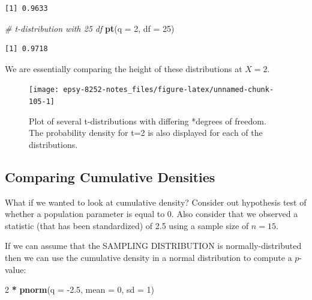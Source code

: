 \documentclass[]{book}
\newenvironment{Shaded}{\begin{snugshade}}{\end{snugshade}}
\newcommand{\CommentTok}[1]{\textcolor[rgb]{0.56,0.35,0.01}{\textit{#1}}}
\newcommand{\DataTypeTok}[1]{\textcolor[rgb]{0.13,0.29,0.53}{#1}}
\newcommand{\DecValTok}[1]{\textcolor[rgb]{0.00,0.00,0.81}{#1}}
\newcommand{\FloatTok}[1]{\textcolor[rgb]{0.00,0.00,0.81}{#1}}
\newcommand{\KeywordTok}[1]{\textcolor[rgb]{0.13,0.29,0.53}{\textbf{#1}}}
\newcommand{\NormalTok}[1]{#1}
\newcommand{\OperatorTok}[1]{\textcolor[rgb]{0.81,0.36,0.00}{\textbf{#1}}}
\newcommand{\StringTok}[1]{\textcolor[rgb]{0.31,0.60,0.02}{#1}}
\begin{document}
\begin{verbatim}
[1] 0.9633
\end{verbatim}

\begin{Shaded}
\begin{Highlighting}[]
\CommentTok{# t-distribution with 25 df}
\KeywordTok{pt}\NormalTok{(}\DataTypeTok{q =} \DecValTok{2}\NormalTok{, }\DataTypeTok{df =} \DecValTok{25}\NormalTok{)}
\end{Highlighting}
\end{Shaded}

\begin{verbatim}
[1] 0.9718
\end{verbatim}

We are essentially comparing the height of these distributions at \(X=2\).

\begin{figure}

{\centering \texttt{[image: epsy-8252-notes\_files/figure-latex/unnamed-chunk-105-1]} 

}

\caption{Plot of several t-distributions with differing *degrees of freedom. The probability density for t=2 is also displayed for each of the distributions.}\label{fig:unnamed-chunk-105}
\end{figure}

\hypertarget{comparing-cumulative-densities}{%
\subsection{Comparing Cumulative Densities}\label{comparing-cumulative-densities}}

What if we wanted to look at cumulative density? Consider out hypothesis test of whether a population parameter is equal to 0. Also consider that we observed a statistic (that has been standardized) of 2.5 using a sample size of \(n=15\).

If we can assume that the SAMPLING DISTRIBUTION is normally-distributed then we can use the cumulative density in a normal distribution to compute a \(p\)-value:

\begin{Shaded}
\begin{Highlighting}[]
\DecValTok{2} \OperatorTok{*}\StringTok{ }\KeywordTok{pnorm}\NormalTok{(}\DataTypeTok{q =} \FloatTok{-2.5}\NormalTok{, }\DataTypeTok{mean =} \DecValTok{0}\NormalTok{, }\DataTypeTok{sd =} \DecValTok{1}\NormalTok{)}
\end{Highlighting}
\end{Shaded}
\end{document}
